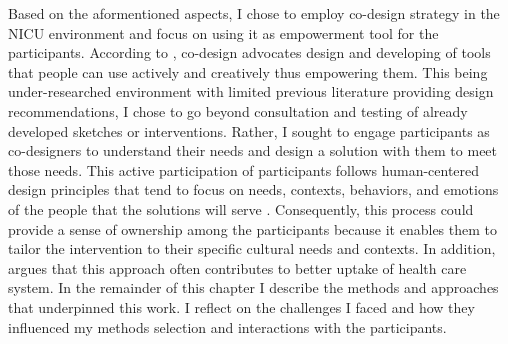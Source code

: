 Based on the aformentioned aspects, I chose to employ co-design strategy in the NICU environment and focus on using it as empowerment tool for the  participants. According to \textcite{Schneider2018}, co-design advocates design and developing of tools that people can use actively and creatively thus empowering them. This being under-researched environment with limited previous literature providing design recommendations, I chose to go beyond consultation and testing of already developed sketches or interventions. Rather, I sought to engage participants as co-designers to understand their needs and design a solution with them to meet those needs. This active participation of participants follows human-centered design principles that tend to focus on needs, contexts, behaviors, and emotions of the people that the solutions will serve \citep{Blandford2018, Buchanan2001}. Consequently, this process could provide a sense of ownership among the participants because it enables them to tailor the intervention to their specific cultural needs and contexts. In addition, \textcite{Verbiest2018} argues that this approach often contributes to better uptake of health care system.  In the remainder of this chapter I describe the methods and approaches that underpinned this work. I reflect on the challenges I faced and how they influenced my methods selection and interactions with the participants.

